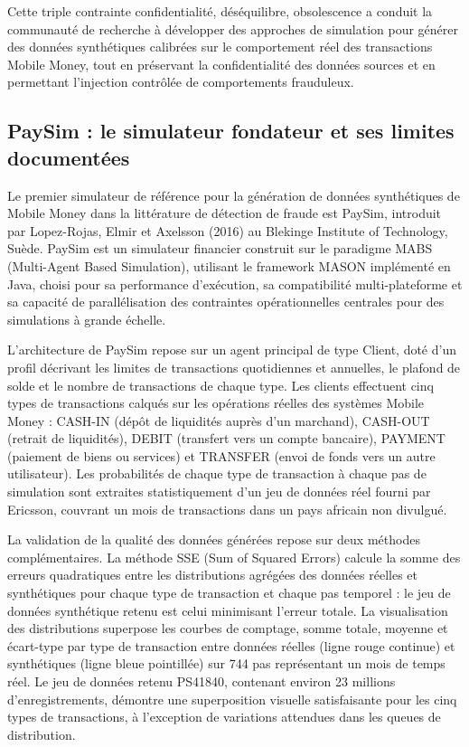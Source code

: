 \documentclass[11pt,a4paper,oneside]{report}
\theoremstyle{definition}
\theoremstyle{remark}
\begin{document}
Cette triple contrainte  confidentialité, déséquilibre, obsolescence  a conduit la communauté de recherche à développer des approches de simulation pour générer des données synthétiques calibrées sur le comportement réel des transactions Mobile Money, tout en préservant la confidentialité des données sources et en permettant l'injection contrôlée de comportements frauduleux.

\subsection{PaySim : le simulateur fondateur et ses limites documentées}

Le premier simulateur de référence pour la génération de données synthétiques de Mobile Money dans la littérature de détection de fraude est PaySim, introduit par Lopez-Rojas, Elmir et Axelsson (2016) au Blekinge Institute of Technology, Suède. PaySim est un simulateur financier construit sur le paradigme MABS (Multi-Agent Based Simulation), utilisant le framework MASON implémenté en Java, choisi pour sa performance d'exécution, sa compatibilité multi-plateforme et sa capacité de parallélisation  des contraintes opérationnelles centrales pour des simulations à grande échelle.

L'architecture de PaySim repose sur un agent principal de type Client, doté d'un profil décrivant les limites de transactions quotidiennes et annuelles, le plafond de solde et le nombre de transactions de chaque type. Les clients effectuent cinq types de transactions calqués sur les opérations réelles des systèmes Mobile Money : CASH-IN (dépôt de liquidités auprès d'un marchand), CASH-OUT (retrait de liquidités), DEBIT (transfert vers un compte bancaire), PAYMENT (paiement de biens ou services) et TRANSFER (envoi de fonds vers un autre utilisateur). Les probabilités de chaque type de transaction à chaque pas de simulation sont extraites statistiquement d'un jeu de données réel fourni par Ericsson, couvrant un mois de transactions dans un pays africain non divulgué.

La validation de la qualité des données générées repose sur deux méthodes complémentaires. La méthode SSE (Sum of Squared Errors) calcule la somme des erreurs quadratiques entre les distributions agrégées des données réelles et synthétiques pour chaque type de transaction et chaque pas temporel : le jeu de données synthétique retenu est celui minimisant l'erreur totale. La visualisation des distributions superpose les courbes de comptage, somme totale, moyenne et écart-type par type de transaction entre données réelles (ligne rouge continue) et synthétiques (ligne bleue pointillée) sur 744 pas représentant un mois de temps réel. Le jeu de données retenu PS41840, contenant environ 23 millions d'enregistrements, démontre une superposition visuelle satisfaisante pour les cinq types de transactions, à l'exception de variations attendues dans les queues de distribution.
\end{document}
